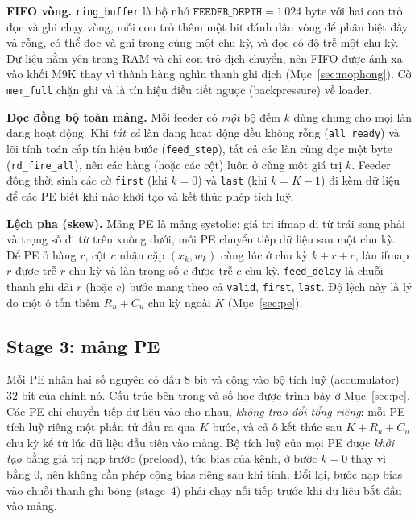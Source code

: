 \textbf{FIFO vòng.} \texttt{ring\_buffer} là bộ nhớ $\texttt{FEEDER\_DEPTH}=1\,024$ byte với hai con trỏ đọc và ghi chạy vòng, mỗi con trỏ thêm một bit đánh dấu vòng để phân biệt đầy và rỗng, có thể đọc và ghi trong cùng một chu kỳ, và đọc có độ trễ một chu kỳ.
Dữ liệu nằm yên trong RAM và chỉ con trỏ dịch chuyển, nên FIFO được ánh xạ vào khối M9K thay vì thành hàng nghìn thanh ghi dịch (Mục~\ref{sec:mophong}).
Cờ \texttt{mem\_full} chặn ghi và là tín hiệu điều tiết ngược (backpressure) về loader.

\textbf{Đọc đồng bộ toàn mảng.} Mỗi feeder có \emph{một} bộ đếm $k$ dùng chung cho mọi làn đang hoạt động.
Khi \emph{tất cả} làn đang hoạt động đều không rỗng (\texttt{all\_ready}) và lõi tính toán cấp tín hiệu bước (\texttt{feed\_step}), tất cả các làn cùng đọc một byte (\texttt{rd\_fire\_all}), nên các hàng (hoặc các cột) luôn ở cùng một giá trị $k$.
Feeder đồng thời sinh các cờ \texttt{first} (khi $k=0$) và \texttt{last} (khi $k=K-1$) đi kèm dữ liệu để các PE biết khi nào khởi tạo và kết thúc phép tích luỹ.

\textbf{Lệch pha (skew).} Mảng PE là mảng systolic: giá trị ifmap đi từ trái sang phải và trọng số đi từ trên xuống dưới, mỗi PE chuyển tiếp dữ liệu sau một chu kỳ.
Để PE ở hàng $r$, cột $c$ nhận cặp $(x_k,w_k)$ cùng lúc ở chu kỳ $k+r+c$, làn ifmap $r$ được trễ $r$ chu kỳ và làn trọng số $c$ được trễ $c$ chu kỳ. \texttt{feed\_delay} là chuỗi thanh ghi dài $r$ (hoặc $c$) bước mang theo cả \texttt{valid}, \texttt{first}, \texttt{last}.
Độ lệch này là lý do một ô tốn thêm $R_u+C_u$ chu kỳ ngoài $K$ (Mục~\ref{sec:pe}).

\subsection{Stage 3: mảng PE}
Mỗi PE nhân hai số nguyên có dấu $8$ bit và cộng vào bộ tích luỹ (accumulator) $32$ bit của chính nó.
Cấu trúc bên trong và số học được trình bày ở Mục~\ref{sec:pe}.
Các PE chỉ chuyển tiếp dữ liệu vào cho nhau, \emph{không trao đổi tổng riêng}: mỗi PE tích luỹ riêng một phần tử đầu ra qua $K$ bước, và cả ô kết thúc sau $K+R_u+C_u$ chu kỳ kể từ lúc dữ liệu đầu tiên vào mảng.
Bộ tích luỹ của mọi PE được \emph{khởi tạo} bằng giá trị nạp trước (preload), tức bias của kênh, ở bước $k=0$ thay vì bằng $0$, nên không cần phép cộng bias riêng sau khi tính.
Đổi lại, bước nạp bias vào chuỗi thanh ghi bóng (stage~4) phải chạy nối tiếp trước khi dữ liệu bắt đầu vào mảng.

